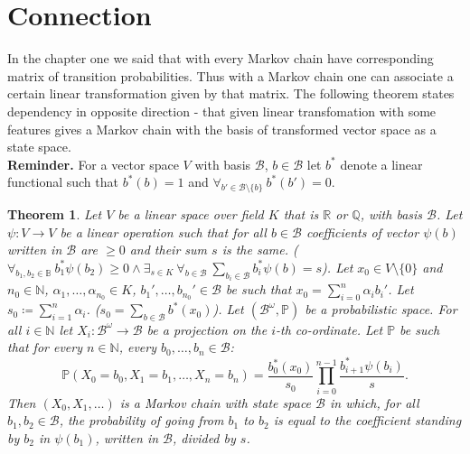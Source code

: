 \documentclass[a4paper, 12pt]{article}
\newtheorem{theorem}{Theorem}
\newcommand{\ndotsm}[3]{{#1}_{#2}, \dots, {#1}_{#3}}
\begin{document}
\section{Connection}
\indent In the chapter one we said that with every Markov chain  have corresponding matrix of transition
probabilities. Thus with a Markov chain one can associate a certain linear transformation given by that
matrix. The following theorem states dependency in opposite direction - that given linear transfomation
with some features gives a Markov chain with the basis of transformed vector space as a state space. \\[8pt]
\indent\textbf{Reminder. } For a vector space $V$ with basis $\mathcal{B}$,
$b \in \mathcal{B}$ let $b^*$
denote a linear functional such that $b^*(b) = 1$ and
$\forall_{b' \in \mathcal{B}\setminus \{b\}}\ b^*(b') = 0$.
\begin{theorem}
Let $V$ be a linear space over field $K$ that is $\mathbb{R}$ or $\mathbb{Q}$,
 with basis $\mathcal{B}$.
Let $\psi : V \to V$ be a linear operation such that for
all $b \in \mathcal{B}$ coefficients of vector $\psi(b)$ written in $\mathcal{B}$ are $\geq 0$ and their
sum $s$ is the same.
($\forall_{b_1, b_2 \in \mathbb{B}}\ b_1^*\psi(b_2) \geq 0 \land \exists_{s \in K}\ \forall_{b \in
\mathcal{B}}\ \displaystyle\sum_{b_i \in \mathcal{B}}b_i^*\psi(b) = s$).
Let $x_0 \in V\setminus\{0\}$ and
$n_0 \in \mathbb{N}$, $\alpha_1, \dots, \alpha_{n_0} \in K$, $b_1', \dots, b_{n_0}' \in \mathcal{B}$
be such that $x_0 = \displaystyle\sum_{i = 0}^n \alpha_i b_i'$. Let $s_0 \coloneqq
\displaystyle\sum_{i = 1}^n \alpha_i$. ($s_0 = \displaystyle\sum_{b \in \mathcal{B}} b^*(x_0)$).
Let $(\mathcal{B}^\omega, \mathbb{P})$ be a probabilistic space. For all $i \in \mathbb{N}$ let
$X_i : \mathcal{B}^\omega \to \mathcal{B}$ be a projection on the $i$-th co-ordinate.
Let $\mathbb{P}$ be such that for every $n \in \mathbb{N}$, every
$\ndotsm{b}{0}{n} \in \mathcal{B}$:
\begin{equation*}
\mathbb{P}(X_0 = b_0, X_1 = b_1, \dots, X_n = b_n) =
\frac{b_0^*(x_0)}{s_0}\prod_{i = 0}^{n-1}\frac{b_{i+1}^*\psi(b_i)}{s}.
\end{equation*}
Then $(X_0, X_1, \dots)$ is a Markov chain with state space $\mathcal{B}$
in which, for all $b_1, b_2 \in \mathcal{B}$, the probability of going from $b_1$ to $b_2$ is equal to the
coefficient standing by $b_2$ in $\psi(b_1)$, written in $\mathcal{B}$, divided by $s$.
\end{theorem}
\end{document}
